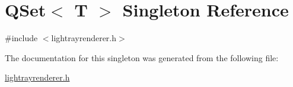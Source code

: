 \hypertarget{singleton_q_set}{\section{Q\+Set$<$ T $>$ Singleton Reference}
\label{singleton_q_set}
}


{\ttfamily \#include $<$lightrayrenderer.\+h$>$}



The documentation for this singleton was generated from the following file\+:\begin{DoxyCompactItemize}
\item 
\hyperlink{lightrayrenderer_8h}{lightrayrenderer.\+h}\end{DoxyCompactItemize}
